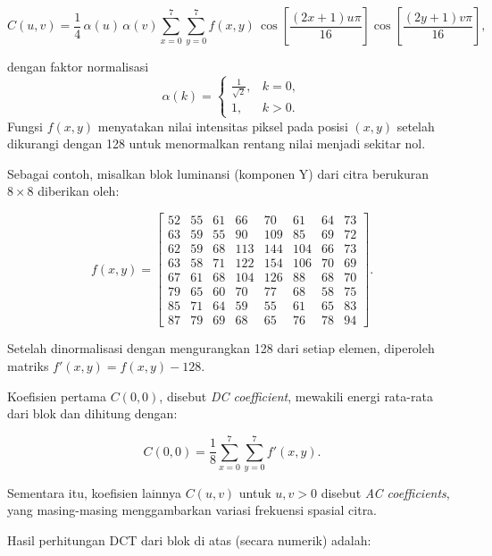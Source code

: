 \documentclass[a4paper]{article}
\begin{document}
\begin{equation}
  C(u,v) = \frac{1}{4} \, \alpha(u)\,\alpha(v)
  \sum_{x=0}^{7}\sum_{y=0}^{7}
  f(x,y)\,
  \cos\!\left[\frac{(2x+1)u\pi}{16}\right]
  \cos\!\left[\frac{(2y+1)v\pi}{16}\right],
\end{equation}

dengan faktor normalisasi
\[
  \alpha(k) =
  \begin{cases}
    \frac{1}{\sqrt{2}}, & k = 0, \\[6pt]
    1,                  & k > 0.
  \end{cases}
\]
Fungsi $f(x,y)$ menyatakan nilai intensitas piksel pada posisi $(x,y)$ setelah dikurangi dengan 128 untuk menormalkan rentang nilai menjadi sekitar nol.

Sebagai contoh, misalkan blok luminansi (komponen Y) dari citra berukuran $8\times8$ diberikan oleh:

\[
  f(x,y) =
  \begin{bmatrix}
    52 & 55 & 61 & 66  & 70  & 61  & 64 & 73 \\
    63 & 59 & 55 & 90  & 109 & 85  & 69 & 72 \\
    62 & 59 & 68 & 113 & 144 & 104 & 66 & 73 \\
    63 & 58 & 71 & 122 & 154 & 106 & 70 & 69 \\
    67 & 61 & 68 & 104 & 126 & 88  & 68 & 70 \\
    79 & 65 & 60 & 70  & 77  & 68  & 58 & 75 \\
    85 & 71 & 64 & 59  & 55  & 61  & 65 & 83 \\
    87 & 79 & 69 & 68  & 65  & 76  & 78 & 94
  \end{bmatrix}.
\]

Setelah dinormalisasi dengan mengurangkan 128 dari setiap elemen, diperoleh matriks $f'(x,y) = f(x,y) - 128$.

Koefisien pertama $C(0,0)$, disebut \textit{DC coefficient}, mewakili energi rata-rata dari blok dan dihitung dengan:

\[
  C(0,0) = \frac{1}{8} \sum_{x=0}^{7}\sum_{y=0}^{7} f'(x,y).
\]

Sementara itu, koefisien lainnya $C(u,v)$ untuk $u,v>0$ disebut \textit{AC coefficients}, yang masing-masing menggambarkan variasi frekuensi spasial citra.

Hasil perhitungan DCT dari blok di atas (secara numerik) adalah:
\end{document}
